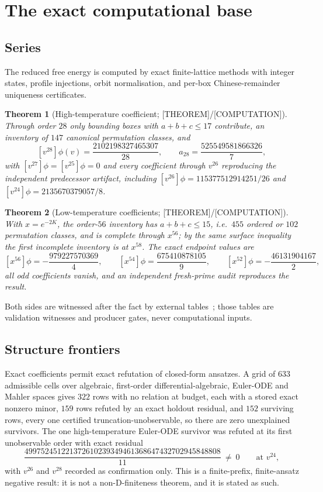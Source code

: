\documentclass[11pt]{article}
\newtheorem{theorem}{Theorem}[section]
\theoremstyle{definition}
\begin{document}
\section{The exact computational base}\label{sec:series}

\subsection{Series}
The reduced free energy is computed by exact finite-lattice methods with integer states, profile
injections, orbit normalisation, and per-box Chinese-remainder uniqueness certificates.

\begin{theorem}[High-temperature coefficient; {[THEOREM]}/{[COMPUTATION]}]
Through order $28$ only bounding boxes with $a+b+c\le17$ contribute, an inventory of $147$ canonical
permutation classes, and
\[
[v^{28}]\phi(v)=\frac{2102198327465307}{28},\qquad
a_{28}=\frac{525549581866326}{7},
\]
with $[v^{27}]\phi=[v^{25}]\phi=0$ and every coefficient through $v^{26}$ reproducing the independent
predecessor artifact, including $[v^{26}]\phi=115377512914251/26$ and
$[v^{24}]\phi=2135670379057/8$.
\end{theorem}

\begin{theorem}[Low-temperature coefficients; {[THEOREM]}/{[COMPUTATION]}]
With $x=e^{-2K}$, the order-$56$ inventory has $a+b+c\le15$, i.e.\ $455$ ordered or $102$ permutation
classes, and is complete through $x^{56}$; by the same surface inequality the first incomplete
inventory is at $x^{58}$. The exact endpoint values are
\[
[x^{56}]\phi=-\frac{979227570369}{4},\qquad
[x^{54}]\phi=\frac{675410878105}{9},\qquad
[x^{52}]\phi=-\frac{46131904167}{2},
\]
all odd coefficients vanish, and an independent fresh-prime audit reproduces the result.
\end{theorem}

Both sides are witnessed after the fact by external tables~\cite{arisuefujiwara2002,%
arisuefujiwara2003,guttmann_enting1993,butera2011}; those tables are validation witnesses and
producer gates, never computational inputs.

\subsection{Structure frontiers}
Exact coefficients permit exact refutation of closed-form ansatzes. A grid of $633$ admissible cells
over algebraic, first-order differential-algebraic, Euler-ODE and Mahler spaces gives $322$ rows with
no relation at budget, each with a stored exact nonzero minor, $159$ rows refuted by an exact holdout
residual, and $152$ surviving rows, every one certified truncation-unobservable, so there are zero
unexplained survivors. The one high-temperature Euler-ODE survivor was refuted at its first
unobservable order with exact residual
\[
\frac{499752451221372610239349461368647432702945848808}{11}\ \ne\ 0
\qquad\text{at }v^{24},
\]
with $v^{26}$ and $v^{28}$ recorded as confirmation only. This is a finite-prefix, finite-ansatz
negative result: it is not a non-D-finiteness theorem, and it is stated as such.
\end{document}
